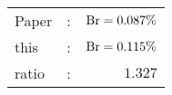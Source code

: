       \begin{tabular}{lcr}
          Paper &:& $\mathrm{Br}  = 0.087\%$ \\
          this      &:& $\mathrm{Br}  = 0.115\%$ \\
		  ratio   &:& $1.327$ \\
      \end{tabular}
